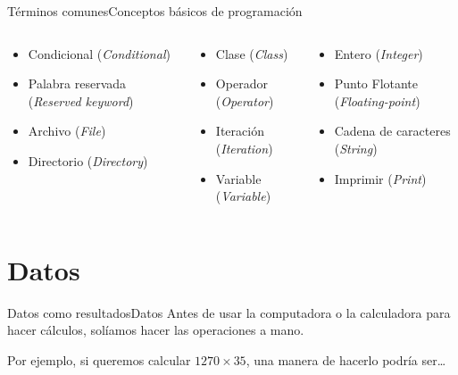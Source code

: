 \documentclass[spanish, c]{beamer}
\begin{document}
\begin{frame}{Términos comunes}{Conceptos básicos de programación}
\begin{columns}
\begin{column}{0.3\textwidth}
        \end{column}
    \end{columns}
    \begin{columns}
        \begin{column}{0.33\textwidth}
            \begin{itemize}
                \item Condicional (\textit{Conditional})
                \item Palabra reservada (\textit{Reserved keyword})
                \item Archivo (\textit{File})
                \item Directorio (\textit{Directory})
            \end{itemize}
        \end{column}
        \begin{column}{0.33\textwidth}
            \begin{itemize}
                \item Clase (\textit{Class})
                \item Operador (\textit{Operator})
                \item Iteración (\textit{Iteration})
                \item Variable (\textit{Variable})
            \end{itemize}
        \end{column}
        \begin{column}{0.33\textwidth}
            \begin{itemize}
                \item Entero (\textit{Integer})
                \item Punto Flotante (\textit{Floating-point})
                \item Cadena de caracteres (\textit{String})
                \item Imprimir (\textit{Print})
            \end{itemize}
        \end{column}
    \end{columns}
\end{frame}

\section{Datos}

\begin{frame}{Datos como resultados}{Datos}
    Antes de usar la computadora o la calculadora para hacer cálculos, solíamos hacer las operaciones a mano.

    \bigskip
    
    Por ejemplo, si queremos calcular $1270 \times 35$, una manera de hacerlo podría ser\dots

\end{frame}
\end{document}
